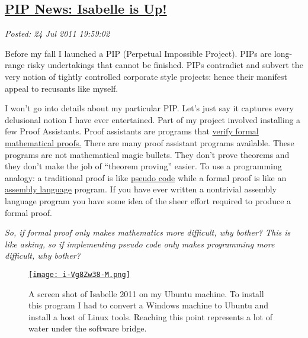 %

\subsection*{\href{http://bakerjd99.wordpress.com/2011/07/24/pip-news-isabelle-is-up/}{PIP News: Isabelle is Up!}}


\noindent\emph{Posted: 24 Jul 2011 19:59:02}
\vspace{6pt}

Before my fall I launched a PIP (Perpetual Impossible Project). PIPs are
long-range risky undertakings that cannot be finished. PIPs
contradict and subvert the very notion of tightly controlled corporate
style projects: hence their manifest appeal to recusants like myself.

I won't go into details about my particular PIP. Let's just say it
captures every delusional notion I have ever entertained. Part of my
project involved installing a few Proof Assistants. Proof assistants are
programs that \href{http://www.cs.ru.nl/~freek/100/}{verify formal
mathematical proofs.} There are many proof assistant programs available.
These programs are not mathematical magic bullets. They don't prove
theorems and they don't make the job of ``theorem proving'' easier. To
use a programming analogy: a traditional proof is like
\href{http://en.wikipedia.org/wiki/Pseudocode}{pseudo code} while a
formal proof is like an
\href{http://en.wikipedia.org/wiki/Assembly\_language}{assembly
language} program. If you have ever written a nontrivial assembly
language program you have some idea of the sheer effort required to
produce a formal proof.

\emph{So, if formal proof only makes mathematics more difficult, why
bother? This is like asking, so if implementing pseudo code only makes
programming more difficult, why bother?}


\captionsetup[figure]{labelformat=empty}
\begin{figure}[htbp]
\centering
\href{http://www.cl.cam.ac.uk/research/hvg/Isabelle/index.html}{\texttt{[image: i-Vg8Zw38-M.png]}}
\caption{A  screen shot of Isabelle 2011 on my Ubuntu machine. To install this  
program I had to convert a Windows machine to Ubuntu and install a host  of Linux tools. 
Reaching this point represents a lot of water under the  software  bridge.}
\label{fig:1658X0}
\end{figure}





%